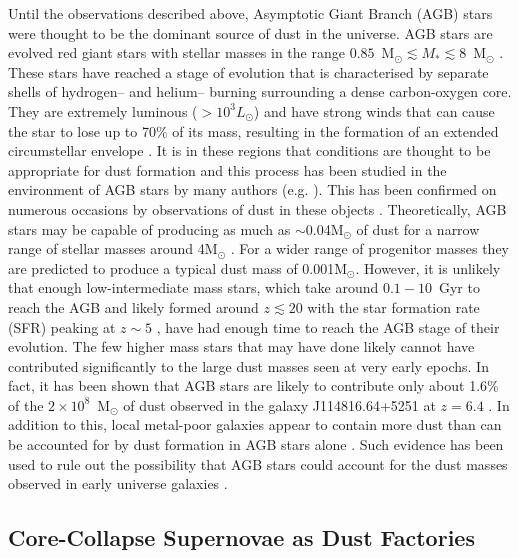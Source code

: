 Until the observations described above, Asymptotic Giant Branch (AGB) stars were thought to be the dominant source of dust in the universe.  AGB stars are evolved red giant stars with stellar masses in the range $0.85$~M$_{\odot} \lesssim M_{*} \lesssim 8$~M$_{\odot}$ \citep{Iben1983}.  These stars have reached a stage of evolution that is characterised by separate shells of hydrogen-- and helium-- burning surrounding a dense carbon-oxygen core. They are extremely luminous ($>10^3L_{\odot}$) and have strong winds that can cause the star to lose up to 70\% of its mass, resulting in the formation of an extended circumstellar envelope \citep{Wood2004a}.  It is in these regions that conditions are thought to be appropriate for dust formation and this process has been studied in the environment of AGB stars by many authors (e.g. \citet{Gail1999,Cherchneff2000,Ferrarotti2005}).  This has been confirmed on numerous occasions by observations of dust  in these objects \citep{Meixner2006,Matsuura2009,Sloan2009,Boyer2011,Boyer2012,Riebel2012,Matsuura2013}. Theoretically, AGB stars may be capable of producing as much as $\sim$0.04M$_{\odot}$ of dust for a narrow range of stellar masses around 4M$_{\odot}$ \citep{Ferrarotti2006}.  For a wider range of progenitor masses they are predicted to produce a typical dust mass of 0.001M$_{\odot}$. However, it is unlikely that enough low-intermediate mass stars, which take around $0.1-10$~Gyr to reach the AGB \citep{Salaris2014} and likely formed around $z\lesssim20$ with the star formation rate (SFR) peaking at $z\sim5$ \citep{Greif2006}, have had enough time to reach the AGB stage of their evolution.  The few higher mass stars that may have done likely cannot have contributed significantly to the large dust masses seen at very early epochs.  In fact, it has been shown that AGB stars are likely to contribute only about 1.6\% of the $2\times 10^8$~M$_{\odot}$ of dust observed in the galaxy J114816.64+5251 at $z=6.4$ \citep{Dwek2007}.  In addition to this, local metal-poor galaxies appear to contain more dust than can be accounted for by dust formation in AGB stars alone \citep{Matsuura2009,Boyer2011,Boyer2012,Matsuura2013}.  Such evidence has been used to rule out the possibility that AGB stars could account for the dust masses observed in early universe galaxies \citep{Michalowski2015}.

\subsection{Core-Collapse Supernovae as Dust Factories}

